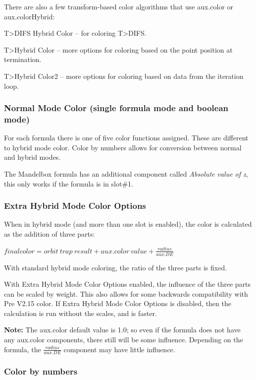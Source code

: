 There are also a few transform-based color algorithms that use aux.color or aux.colorHybrid:

T>DIFS Hybrid Color -- for coloring T>DIFS.

T>Hybrid Color -- more options for coloring based on the point position at termination.

T>Hybrid Color2 -- more options for coloring based on data from the iteration loop.

\subsubsection{Normal Mode Color (single formula mode and boolean mode)}\label{materials-normal-mode-color}

For each formula there is one of five color functions assigned.
These are different to hybrid mode color. Color by numbers allows for conversion between normal and hybrid modes.

The Mandelbox formula has an additional component called \emph{Absolute value of z}, this only works if the formula is in slot\#1.


\subsubsection{Extra Hybrid Mode Color Options}\label{materials-extra-hybrid-mode-color-options}

When in hybrid mode (and more than one slot is enabled), the color is calculated as the addition of three parts:

\(final color = orbit\ trap\ result + aux.color\ value + \frac{radius}{aux.DE}\)

With standard hybrid mode coloring, the ratio of the three parts is fixed.

With Extra Hybrid Mode Color Options enabled, the influence of the three parts can be scaled by weight. This also allows for some backwards compatibility with Pre V2.15 color. If Extra Hybrid Mode Color Options is disabled, then the calculation is run without the scales, and is faster.

\textbf{Note:} The aux.color default value is 1.0; so even if the formula does not have any aux.color components, there still will be some influence. Depending on the formula, the \(\frac{radius}{aux.DE}\) component may have little influence.

\subsubsection{Color by numbers}\label{materials-color-by-numbers}

